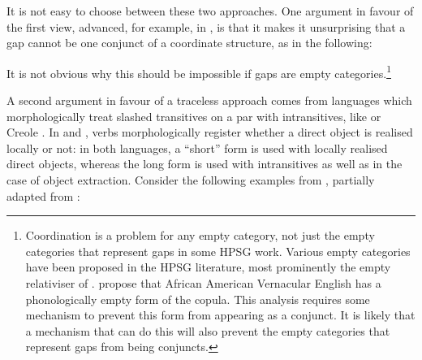 \documentclass[output=paper,biblatex,babelshorthands,newtxmath,draftmode,colorlinks,citecolor=brown]{langscibook}
\begin{document}
It is not easy to choose between these two approaches. One argument in
favour of the first view, advanced, for example, in \citet[Section~3.5.2]{Bouma:Malouf:Sag:01}, is that it makes it unsurprising that a gap cannot be one
conjunct of a coordinate structure, as in the following:

\begin{exe} \ex \begin{xlist} \label{ex:UDC:22}

\end{xlist}
\end{exe}

\noindent
It is not obvious why this should be impossible if gaps are empty
categories.\footnote{Coordination is a problem for any empty category,
  not just the empty categories that represent gaps in some HPSG
  work. Various empty categories have been proposed in the HPSG
  literature, most prominently the empty relativiser of
  \citet[Chapter~5]{Pollard:Sag:94}. \citet[Section~15.3.5]{Sag:Wasow:ea:03}
  propose that African American Vernacular English has a
  phonologically empty form of the copula. This analysis requires some
  mechanism to prevent this form from appearing as a conjunct. It is
  likely that a mechanism that can do this will also prevent the empty
  categories that represent gaps from being conjuncts.
 }

 A second argument in favour of a traceless approach comes from
 languages which morphologically treat slashed transitives on a par
 with intransitives, like  \citep{crysmann_b04yom} or
  Creole  \citep{Henri10}. In 
 and , verbs morphologically register whether a direct
 object is realised locally or not: in both languages, a ``short''
 form is used with locally realised direct objects, whereas the long
 form is used with intransitives as well as in the case of object
 extraction. Consider the following examples from ,
 partially adapted from \citet[632--633]{newman_p00}:
\end{document}

